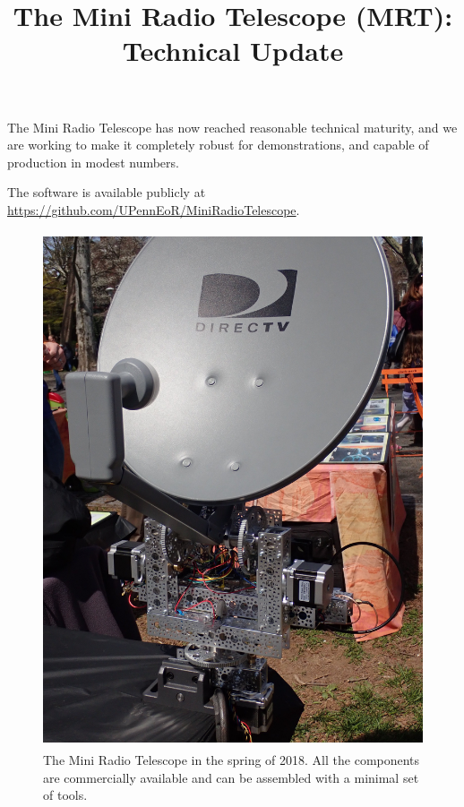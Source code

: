 \documentclass[11pt,letterpaper]{spie}
\title{The Mini Radio Telescope (MRT):\\
Technical Update}
\begin{document}
\maketitle

The Mini Radio Telescope has now reached reasonable technical maturity, and we are working to make it completely robust for demonstrations, and capable of production in modest numbers.

The software is available publicly at \url{https://github.com/UPennEoR/MiniRadioTelescope}.

\begin{figure}[h]
\centering
\includegraphics[height=6in]{MRT.jpg}
\vspace{5pt}
\caption{The Mini Radio Telescope in the spring of 2018.  All the components are commercially available and can be assembled with a minimal set of tools.}
\label{fig:Devices}
\end{figure}
\end{document}
